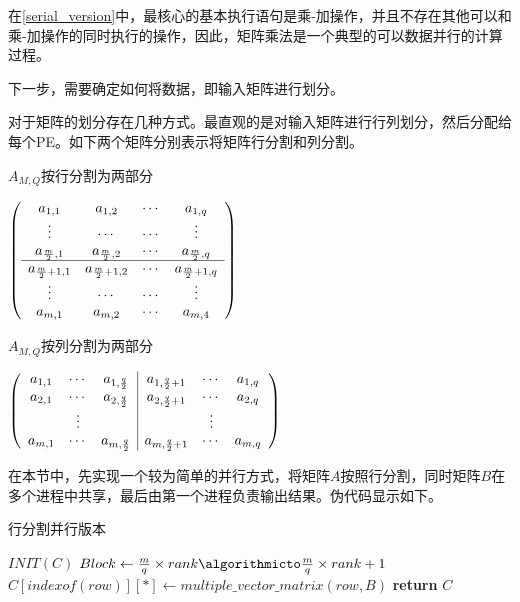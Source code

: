 在\ref{serial_version}中，最核心的基本执行语句是乘-加操作，并且不存在其他可以和乘-加操作的同时执行的操作，因此，矩阵乘法是一个典型的可以数据并行的计算过程。

下一步，需要确定如何将数据，即输入矩阵进行划分。

对于矩阵的划分存在几种方式\cite{book:zhang}。最直观的是对输入矩阵进行行列划分，然后分配给每个PE。如下两个矩阵分别表示将矩阵行分割和列分割。
\begin{table}
\begin{center}
\caption{$A_{M,Q}$按行分割为两部分}
\begin{math}
\raggedleft
\left(\begin{array}{cccc}
a_{1,1} & a_{1,2} & \cdots & a_{1,q} \\
\vdots	& \cdots  &	\cdots	& \vdots	\\
a_{\frac{m}{2},1} & a_{\frac{m}{2},2} & \cdots & a_{\frac{m}{2},q} \\
\hline
a_{\frac{m}{2}+1,1} & a_{\frac{m}{2}+1,2} & \cdots & a_{\frac{m}{2}+1,q} \\
\vdots &	 \cdots & \cdots & \vdots \\
a_{m,1} & a_{m,2} & \cdots & a_{m,4}
\end{array}\right)
\end{math}
\end{center}
\end{table}
\begin{table}
\caption{$A_{M,Q}$按列分割为两部分}
\begin{center}
\begin{math}
\raggedleft
\left(\begin{array}{ccc|ccc}
a_{1,1} & \cdots & a_{1,\frac{q}{2}} & a_{1,\frac{q}{2}+1} & \cdots & a_{1,q}\\
a_{2,1} & \cdots & a_{2,\frac{q}{2}} & a_{2,\frac{q}{2}+1} & \cdots & a_{2,q}\\
 & \vdots & & & \vdots &\\
a_{m,1} & \cdots & a_{m,\frac{q}{2}} & a_{m,\frac{q}{2}+1} & \cdots & a_{m,q}
\end{array}\right)
\end{math}
\end{center}
\end{table}
在本节中，先实现一个较为简单的并行方式，将矩阵$A$按照行分割，同时矩阵$B$在多个进程中共享，最后由第一个进程负责输出结果。伪代码显示如下。
\begin{algorithm}
\hline
\caption{行分割并行版本}\label{divide_row_version} 
\hline
\algnewcommand{}
\algnewcommand{}
\algnewcommand{}
\begin{algorithmic}[5]
\State $INIT(C)$ 
	\State $Block \gets \frac{m}{q}\times rank \algorithmicto \frac{m}{q}\times rank+1$
		\State $C[indexof(row)][*] \gets multiple\_vector\_matrix(row,B)$
	\EndFor
\EndFor
\State \textbf{return} $C$
\EndFunction
\end{algorithmic}
\end{algorithm}
\hline

